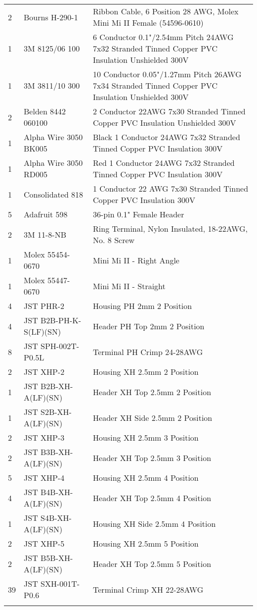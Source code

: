 \begin{longtabu}{X[1,c,m] X[6,c,m] X[9,l,m]}
  2 & Bourns H-290-1 & Ribbon Cable, 6 Position 28 AWG, Molex Mini Mi II Female (54596-0610) \\
  1 & 3M 8125/06 100 & 6 Conductor 0.1"/2.54mm Pitch 24AWG 7x32 Stranded Tinned Copper PVC Insulation Unshielded 300V \\
  1 & 3M 3811/10 300 & 10 Conductor 0.05"/1.27mm Pitch 26AWG 7x34 Stranded Tinned Copper PVC Insulation Unshielded 300V \\
  2 & Belden 8442 060100 & 2 Conductor 22AWG 7x30 Stranded Tinned Copper PVC Insulation Unshielded 300V \\
  1 & Alpha Wire 3050 BK005 & Black 1 Conductor 24AWG 7x32 Stranded Tinned Copper PVC Insulation 300V \\
  1 & Alpha Wire 3050 RD005 & Red 1 Conductor 24AWG 7x32 Stranded Tinned Copper PVC Insulation 300V \\
  1 & Consolidated 818 & 1 Conductor 22 AWG 7x30 Stranded Tinned Copper PVC Insulation 300V \\ \mrule

  5 & Adafruit 598 & 36-pin 0.1" Female Header \\
  2 & 3M 11-8-NB & Ring Terminal, Nylon Insulated, 18-22AWG, No. 8 Screw \\
  1 & Molex 55454-0670 & Mini Mi II - Right Angle \\
  1 & Molex 55447-0670 & Mini Mi II - Straight \\
  4 & JST PHR-2 & Housing PH 2mm 2 Position \\
  4 & JST B2B-PH-K-S(LF)(SN) & Header PH Top 2mm 2 Position \\
  8 & JST SPH-002T-P0.5L & Terminal PH Crimp 24-28AWG \\
  2 & JST XHP-2 & Housing XH 2.5mm 2 Position \\
  1 & JST B2B-XH-A(LF)(SN) & Header XH Top 2.5mm 2 Position \\
  1 & JST S2B-XH-A(LF)(SN) & Header XH Side 2.5mm 2 Position \\
  2 & JST XHP-3 & Housing XH 2.5mm 3 Position \\
  2 & JST B3B-XH-A(LF)(SN) & Header XH Top 2.5mm 3 Position \\
  5 & JST XHP-4 & Housing XH 2.5mm 4 Position \\
  4 & JST B4B-XH-A(LF)(SN) & Header XH Top 2.5mm 4 Position \\
  1 & JST S4B-XH-A(LF)(SN) & Housing XH Side 2.5mm 4 Position \\
  2 & JST XHP-5 & Housing XH 2.5mm 5 Position \\
  2 & JST B5B-XH-A(LF)(SN) & Header XH Top 2.5mm 5 Position \\
  39 & JST SXH-001T-P0.6 & Terminal Crimp XH 22-28AWG \\ \mrule


\end{longtabu}

